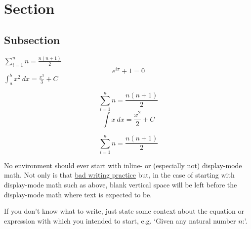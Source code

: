 \section{Section}

\lipsum[1-2]

\subsection{Subsection}

\lipsum[][1-9]

\begin{defn}
    \lipsum[][1] \(\sum_{i=1}^{n} n = \frac{n(n+1)}{2}\) \lipsum[][2-3]
    \[e^{i\pi}+1 = 0\]
    \lipsum[][4] \(\int_{a}^{b} x^2 \ dx = \frac{x^3}{3} + C\) \lipsum[][5-6]
\end{defn}

\begin{nota}
    \lipsum[][1-3]
    \[\sum_{i=1}^{n} n = \frac{n(n+1)}{2}\]
    \lipsum[][4-5]
    \[\int x \ dx = \frac{x^2}{2} + C\]
    \lipsum[][6-7]
\end{nota}

\begin{defn}
    \[\sum_{i=1}^{n} n = \frac{n(n+1)}{2}\]
    \lipsum[][3-5]
\end{defn}

\begin{rmrk}
    No environment should ever start with inline- or (especially not) display-mode math. Not only is that \href{https://kconrad.math.uconn.edu/blurbs/proofs/writingtips.pdf}{bad writing practice} but, in the case of starting with display-mode math such as above, blank vertical space will be left before the display-mode math where text is expected to be.

    If you don't know what to write, just state some context about the equation or expression with which you intended to start, e.g. `Given any natural number \(n\):'.
\end{rmrk}

